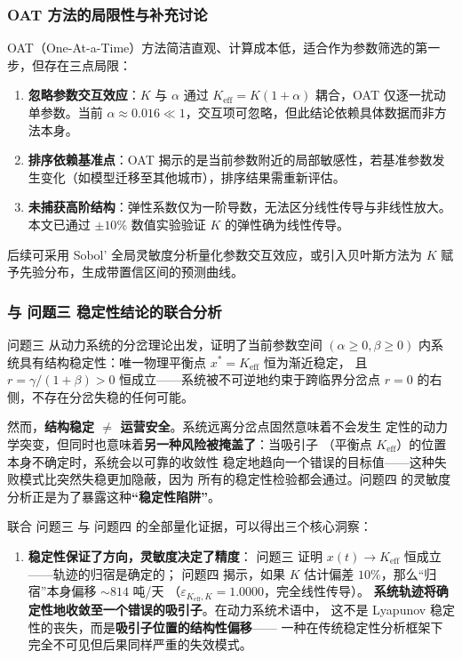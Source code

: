 \documentclass[12pt,a4paper]{ctexart}
\begin{document}
\begin{table}[htbp]
\subsubsection{OAT 方法的局限性与补充讨论}

OAT（One-At-a-Time）方法简洁直观、计算成本低，适合作为参数筛选的第一步，但存在三点局限：

\begin{enumerate}
    \item \textbf{忽略参数交互效应}：$K$ 与 $\alpha$ 通过 $K_{\text{eff}} = K(1+\alpha)$ 耦合，OAT 仅逐一扰动单参数。当前 $\alpha \approx 0.016 \ll 1$，交互项可忽略，但此结论依赖具体数据而非方法本身。

    \item \textbf{排序依赖基准点}：OAT 揭示的是当前参数附近的局部敏感性，若基准参数发生变化（如模型迁移至其他城市），排序结果需重新评估。

    \item \textbf{未捕获高阶结构}：弹性系数仅为一阶导数，无法区分线性传导与非线性放大。本文已通过 $\pm10\%$ 数值实验验证 $K$ 的弹性确为线性传导。
\end{enumerate}

后续可采用 Sobol' 全局灵敏度分析\cite{saltelli2008}量化参数交互效应，或引入贝叶斯方法为 $K$ 赋予先验分布，生成带置信区间的预测曲线。

\subsubsection{与 问题三 稳定性结论的联合分析}

问题三 从动力系统的分岔理论出发，证明了当前参数空间 $(\alpha \geq 0, \beta \geq 0)$
内系统具有结构稳定性：唯一物理平衡点 $x^* = K_{\text{eff}}$ 恒为渐近稳定，
且 $r = \gamma/(1+\beta) > 0$ 恒成立——系统被不可逆地约束于跨临界分岔点
$r = 0$ 的右侧，不存在分岔失稳的任何可能。

然而，\textbf{结构稳定 $\neq$ 运营安全}。系统远离分岔点固然意味着不会发生
定性的动力学突变，但同时也意味着\textbf{另一种风险被掩盖了}：当吸引子
（平衡点 $K_{\text{eff}}$）的位置本身不确定时，系统会以可靠的收敛性
稳定地趋向一个错误的目标值——这种失败模式比突然失稳更加隐蔽，因为
所有的稳定性检验都会通过。问题四 的灵敏度分析正是为了暴露这种\textbf{``稳定性陷阱''}。

联合 问题三 与 问题四 的全部量化证据，可以得出三个核心洞察：

\begin{enumerate}
  \item \textbf{稳定性保证了方向，灵敏度决定了精度}：
        问题三 证明 $x(t) \to K_{\text{eff}}$ 恒成立——轨迹的归宿是确定的；
        问题四 揭示，如果 $K$ 估计偏差 $10\%$，那么``归宿''本身偏移 $\sim 814$ 吨/天
        （$\varepsilon_{K_{\text{eff}}, K} = 1.0000$，完全线性传导）。
        \textbf{系统轨迹将确定性地收敛至一个错误的吸引子}。在动力系统术语中，
        这不是 Lyapunov 稳定性的丧失，而是\textbf{吸引子位置的结构性偏移}——
        一种在传统稳定性分析框架下完全不可见但后果同样严重的失效模式。


\end{enumerate}
\end{table}
\end{document}
